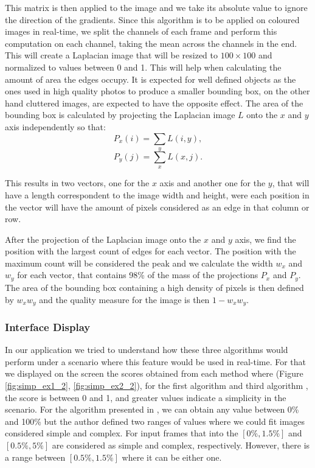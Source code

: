This matrix is then applied to the image and we take its absolute value to ignore the direction of the gradients. Since this algorithm is to be applied on coloured images in real-time, we split the channels of each frame and perform this computation on each channel, taking the mean across the channels in the end. This will create a Laplacian image that will be resized to $100\times100$ and normalized to values between 0 and 1. This will help when calculating the amount of area the edges occupy. It is expected for well defined objects as the ones used in high quality photos to produce a smaller bounding box, on the other hand cluttered images, are expected to have the opposite effect.
The area of the bounding box is calculated by projecting the Laplacian image $L$ onto the $x$ and $y$ axis independently so that:
\begin{equation}
P_{x}(i) = \sum_{y} L(i,y),
\end{equation}
\begin{equation}
P_{y}(j) = \sum_{x} L(x,j).
\end{equation}

This results in two vectors, one for the $x$ axis and another one for the $y$, that will have a length correspondent to the image width and height, were each position in the vector will have the amount of pixels considered as an edge in that column or row.

After the projection of the Laplacian image onto the $x$ and $y$ axis, we find the position with the largest count of edges for each vector. The position with the maximum count will be considered the peak and we calculate the width $w_{x}$ and $w_{y}$ for each vector, that contains 98\% of the mass of the projections $P_{x}$ and $P_{y}$. The area of the bounding box containing a high density of pixels is then defined by $w_{x}w_{y}$ and the quality measure for the image is then $1-w_{x}w_{y}$.

\subsubsection{Interface Display}

In our application we tried to understand how these three algorithms would perform under a scenario where this feature would be used in real-time. For that we displayed on the screen the scores obtained from each method where (Figure \ref{fig:simp_ex1_2}, \ref{fig:simp_ex2_2}), for the first algorithm \cite{kaoautomatic} and third algorithm \cite{ke2006design}, the score is between 0 and 1, and greater values indicate a simplicity in the scenario. 
For the algorithm presented in \cite{luo2008photo}, we can obtain any value between 0\% and 100\% but the author defined two ranges of values where we could fit images considered simple and complex. For input frames that into the $[0\%,1.5\%]$ and $[0.5\%,5\%]$ are considered as simple and complex, respectively. However, there is a range between $[0.5\%,1.5\%]$ where it can be either one.
 
